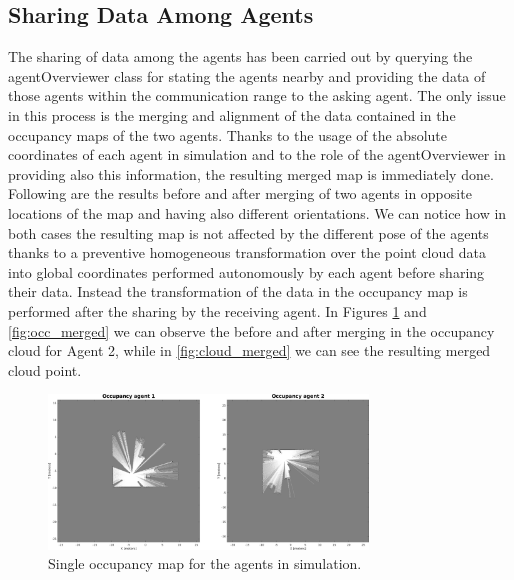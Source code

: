 \documentclass[twocolumn, a4paper]{article}
\begin{document}
\subsection{Sharing Data Among Agents}
The sharing of data among the agents has been carried out by querying the
agentOverviewer class for stating the agents nearby and providing the
data of those agents within the communication range to the asking agent.
The only issue in this process is the merging and alignment of the data
contained in the occupancy maps of the two agents. Thanks to
the usage of the absolute coordinates of each agent in simulation and to
the role of the agentOverviewer in providing also this information, the
resulting merged map is immediately done. Following are the results before
and after merging of two agents in opposite locations of the map and having
also different orientations. We can notice how in both cases the resulting
map is not affected by the different pose of the agents thanks to a 
preventive homogeneous transformation over the point cloud data into global
coordinates performed autonomously by each agent before sharing their data.
Instead the transformation of the data in the occupancy map is performed
after the sharing by the receiving agent. In Figures \ref{fig:occ_single} and
\ref{fig:occ_merged} we can observe the before and after merging in the
occupancy cloud for Agent 2, while in \ref{fig:cloud_merged} we can see
the resulting merged cloud point.
\vspace{0.5cm}
\begin{figure}[h!]
    \centering
    \includegraphics[width=8.5cm]{"../Report_images/Single_occupancies.png"}
    \caption{Single occupancy map for the agents in simulation.}
    \label{fig:occ_single}
\end{figure}
\vfill
\end{document}
